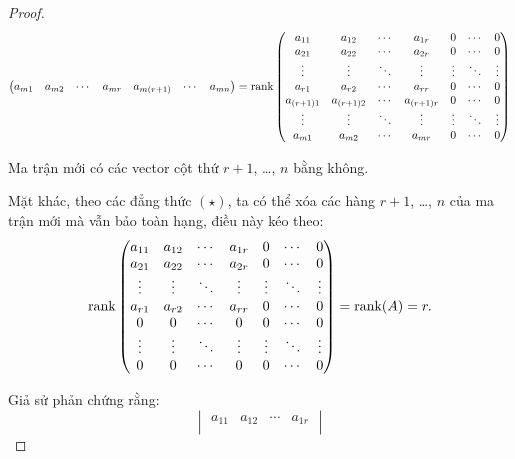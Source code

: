\documentclass[class=linearalgebra,crop=false]{standalone}
\begin{document}
\begin{proof}
\[\begin{pmatrix}
            a_{m1}     & a_{m2}     & \cdots & a_{mr}     & a_{m(r+1)}     & \cdots & a_{mn}
        \end{pmatrix}
        =
        \text{rank}
        \begin{pmatrix}
            a_{11}     & a_{12}     & \cdots & a_{1r}     & 0      & \cdots & 0      \\
            a_{21}     & a_{22}     & \cdots & a_{2r}     & 0      & \cdots & 0      \\
            \vdots     & \vdots     & \ddots & \vdots     & \vdots & \ddots & \vdots \\
            a_{r1}     & a_{r2}     & \cdots & a_{rr}     & 0      & \cdots & 0      \\
            a_{(r+1)1} & a_{(r+1)2} & \cdots & a_{(r+1)r} & 0      & \cdots & 0      \\
            \vdots     & \vdots     & \ddots & \vdots     & \vdots & \ddots & \vdots \\
            a_{m1}     & a_{m2}     & \cdots & a_{mr}     & 0      & \cdots & 0
        \end{pmatrix}
    \]
    \par Ma trận mới có các vector cột thứ $r+1$, \ldots, $n$ bằng không.
    \par Mặt khác, theo các đẳng thức $(\star)$, ta có thể xóa các hàng $r+1$, \ldots, $n$ của ma trận mới mà vẫn bảo toàn hạng, điều này kéo theo:
    \[
        \text{rank}
        \begin{pmatrix}
            a_{11} & a_{12} & \cdots & a_{1r} & 0      & \cdots & 0      \\
            a_{21} & a_{22} & \cdots & a_{2r} & 0      & \cdots & 0      \\
            \vdots & \vdots & \ddots & \vdots & \vdots & \ddots & \vdots \\
            a_{r1} & a_{r2} & \cdots & a_{rr} & 0      & \cdots & 0      \\
            0      & 0      & \cdots & 0      & 0      & \cdots & 0      \\
            \vdots & \vdots & \ddots & \vdots & \vdots & \ddots & \vdots \\
            0      & 0      & \cdots & 0      & 0      & \cdots & 0
        \end{pmatrix}
        = \text{rank}(A) = r.
    \]
    \par Giả sử phản chứng rằng:
    \[
        \begin{vmatrix}
            a_{11} & a_{12} & \cdots & a_{1r} \\

\end{vmatrix}\]
\end{proof}
\end{document}
